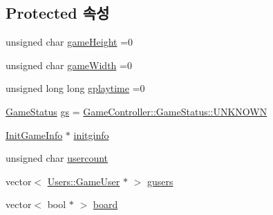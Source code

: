 \subsection*{Protected 속성}
\begin{DoxyCompactItemize}
\item 
unsigned char \hyperlink{class_tetris_1_1_game_controller_a8e3adc647ed382de0ff541417bea9b33}{game\+Height} =0
\item 
unsigned char \hyperlink{class_tetris_1_1_game_controller_a439f215918db4127fcb44cf9d501ed63}{game\+Width} =0
\item 
unsigned long long \hyperlink{class_tetris_1_1_game_controller_a562adcade20e362160535cd7248a2cce}{gplaytime} =0
\item 
\hyperlink{class_tetris_1_1_game_controller_a96a963b56385f3b3a122ff0ca2beb770}{Game\+Status} \hyperlink{class_tetris_1_1_game_controller_ae4c894005a82404c73a5a9a6efb208dc}{gs} = \hyperlink{class_tetris_1_1_game_controller_a96a963b56385f3b3a122ff0ca2beb770a696b031073e74bf2cb98e5ef201d4aa3}{Game\+Controller\+::\+Game\+Status\+::\+U\+N\+K\+N\+O\+WN}
\item 
\hyperlink{class_tetris_1_1_init_game_info}{Init\+Game\+Info} $\ast$ \hyperlink{class_tetris_1_1_game_controller_adaefa9bbdd0d73ec58173dce327373ca}{initginfo}
\item 
unsigned char \hyperlink{class_tetris_1_1_game_controller_aafb18b3b4fe5621bfb60fc42b1e8da09}{usercount}
\item 
vector$<$ \hyperlink{class_tetris_1_1_users_1_1_game_user}{Users\+::\+Game\+User} $\ast$ $>$ \hyperlink{class_tetris_1_1_game_controller_a1a31d3a933daad6d95e20458eea2900e}{gusers}
\item 
vector$<$ bool $\ast$ $>$ \hyperlink{class_tetris_1_1_game_controller_a7725b6cec9459a6bffaa3e29dd1c5196}{board}
\end{DoxyCompactItemize}
